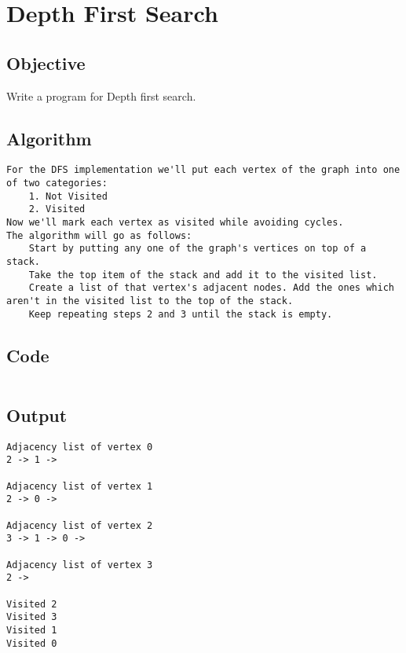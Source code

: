 \section{Depth First Search}
\label{sec:Depth First Search}

\subsection{Objective}
Write a program for Depth first search.

\subsection{Algorithm}
\begin{lstlisting}[style=mystyle]
For the DFS implementation we'll put each vertex of the graph into one of two categories:
    1. Not Visited
    2. Visited
Now we'll mark each vertex as visited while avoiding cycles.
The algorithm will go as follows:
    Start by putting any one of the graph's vertices on top of a stack.
    Take the top item of the stack and add it to the visited list.
    Create a list of that vertex's adjacent nodes. Add the ones which aren't in the visited list to the top of the stack.
    Keep repeating steps 2 and 3 until the stack is empty.
\end{lstlisting}

\subsection{Code}
\inputminted[]{c}{../../Code/dfs.c}

\subsection{Output}
\begin{lstlisting}[style=output]
Adjacency list of vertex 0
2 -> 1 -> 

Adjacency list of vertex 1
2 -> 0 -> 

Adjacency list of vertex 2
3 -> 1 -> 0 -> 

Adjacency list of vertex 3
2 -> 

Visited 2 
Visited 3 
Visited 1 
Visited 0 
\end{lstlisting}

\pagebreak
